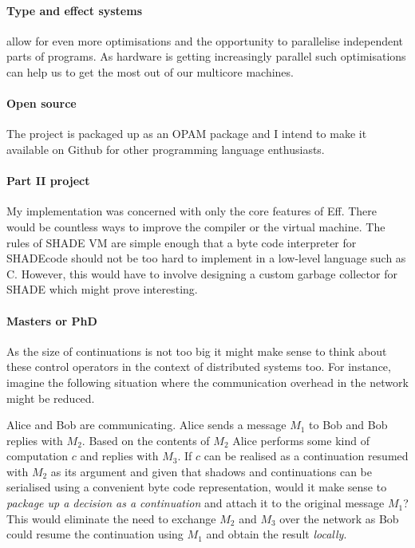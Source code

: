 \documentclass[class=article, crop=false]{standalone}
\begin{document}
\paragraph{Type and effect systems \cite{bauer2013effect}}
allow for even more optimisations
and the opportunity to parallelise independent parts of programs. As hardware is
getting increasingly parallel such optimisations can help us to get the most out
of our multicore machines.

\paragraph{Open source}
The project is packaged up as an OPAM package and I intend to make it available
on Github for other programming language enthusiasts.

\paragraph{Part II project}
My implementation was concerned with only the core
features of Eff. There would be countless ways to improve the compiler or the
virtual machine. The rules of SHADE VM are simple enough that a byte code interpreter
for SHADEcode should not be too hard to implement in a low-level language such as C.
However, this would have to involve designing a custom garbage collector for SHADE
which might prove interesting.

\paragraph{Masters or PhD}
As the size of continuations is not too big it might make sense to think about
these control operators in the context of distributed systems too.
For instance, imagine the following situation where the communication overhead
in the network might be reduced.

Alice and Bob are communicating. Alice sends a message $M_1$ to Bob and Bob
replies with $M_2$. Based on the contents of $M_2$ Alice performs some kind of
computation $c$ and replies with $M_3$. If $c$ can be realised as a continuation
resumed with $M_2$ as its argument and given that shadows and continuations can be
serialised using a convenient byte code representation, would it make sense to
\emph{package up a decision as a continuation} and attach it to the original
message $M_1$? This would eliminate the need to exchange $M_2$ and $M_3$
over the network as Bob could resume the continuation using $M_1$ and obtain
the result \emph{locally}.
\end{document}
